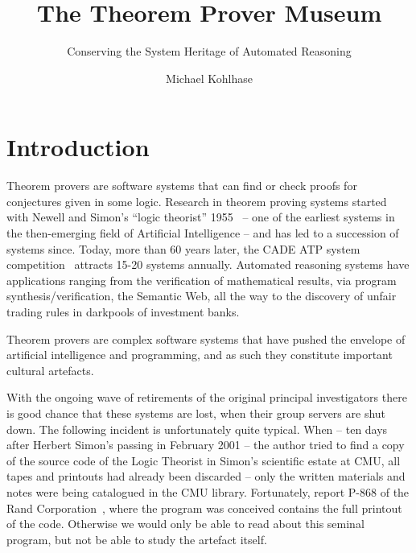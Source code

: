 \documentclass[smallcondensed]{svjour3}
\title{The Theorem Prover Museum}
\subtitle{Conserving the System Heritage of Automated Reasoning}
\author{Michael Kohlhase}
\institute{Computer Science, FAU Erlangen-N\"urnberg\\\url{http://kwarc.info/kohlhase}}
\begin{document}
\maketitle
\begin{abstract}
\end{abstract}
\section{Introduction}\label{sec:intro}

Theorem provers are software systems that can find or check proofs for conjectures given
in some logic. Research in theorem proving systems started with Newell and Simon's ``logic
theorist'' 1955~\cite{NewSim:ltmcips56} -- one of the earliest systems in the
then-emerging field of Artificial Intelligence -- and has led to a succession of systems
since. Today, more than 60 years later, the CADE ATP system competition~\cite{CASC}
attracts 15-20 systems annually. Automated reasoning systems have applications ranging
from the verification of mathematical results, via program synthesis/verification, the
Semantic Web, all the way to the discovery of unfair trading rules in darkpools of
investment banks.

Theorem provers are complex software systems that have pushed the envelope of artificial
intelligence and programming, and as such they constitute important cultural
artefacts.

With the ongoing wave of retirements of the original principal investigators there is good
chance that these systems are lost, when their group servers are shut down. The following
incident is unfortunately quite typical. When -- ten days after Herbert Simon's passing in
February 2001 -- the author tried to find a copy of the source code of the Logic Theorist
in Simon's scientific estate at CMU, all tapes and printouts had already been discarded --
only the written materials and notes were being catalogued in the CMU
library. Fortunately, report P-868 of the Rand Corporation~\cite{NewSim:ltmcips56}, where
the program was conceived contains the full printout of the code. Otherwise we would only
be able to read about this seminal program, but not be able to study the artefact
itself. 
\end{document}

